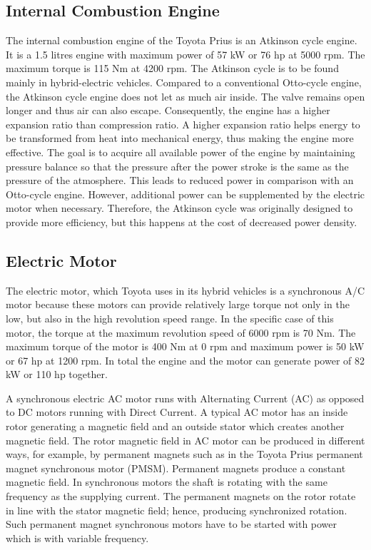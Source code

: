 \subsection{Internal Combustion Engine}
The internal combustion engine of the Toyota Prius is an Atkinson cycle engine. It is a 1.5 litres engine with maximum power of 57 kW or 76 hp at 5000 rpm. The maximum torque is 115 Nm at 4200 rpm. The Atkinson cycle is to be found mainly in hybrid-electric vehicles. Compared to a conventional Otto-cycle engine, the Atkinson cycle engine does not let as much air inside. The valve remains open longer and thus air can also escape. Consequently, the engine has a higher expansion ratio than compression ratio. A higher expansion ratio helps energy to be transformed from heat into mechanical energy, thus making the engine more effective. The goal is to acquire all available power of the engine by maintaining pressure balance so that the pressure after the power stroke is the same as the pressure of the atmosphere. This leads to reduced power in comparison with an Otto-cycle engine. However, additional power can be supplemented by the electric motor when necessary. Therefore, the Atkinson cycle was originally designed to provide more efficiency, but this happens at the cost of decreased power density. 

\subsection{Electric Motor}
The electric motor, which Toyota uses in its hybrid vehicles is a synchronous A/C motor because these motors can provide relatively large torque not only in the low, but also in the high revolution speed range. In the specific case of this motor, the torque at the maximum revolution speed of 6000 rpm is 70 Nm. The maximum torque of the motor is 400 Nm at 0 rpm and maximum power is 50 kW or 67 hp at 1200 rpm. In total the engine and the motor can generate power of 82 kW or 110 hp together.

A synchronous electric AC motor runs with Alternating Current (AC) as opposed to DC motors running with Direct Current. A typical AC motor has an inside rotor generating a magnetic field and an outside stator which creates another magnetic field. The rotor magnetic field in AC motor can be produced in different ways, for example, by permanent magnets such as in the Toyota Prius permanent magnet synchronous motor (PMSM). Permanent magnets produce a constant magnetic field. In synchronous motors the shaft is rotating with the same frequency as the supplying current. The permanent magnets on the rotor rotate in line with the stator magnetic field; hence, producing synchronized rotation. Such permanent magnet synchronous motors have to be started with power which is with variable frequency.

